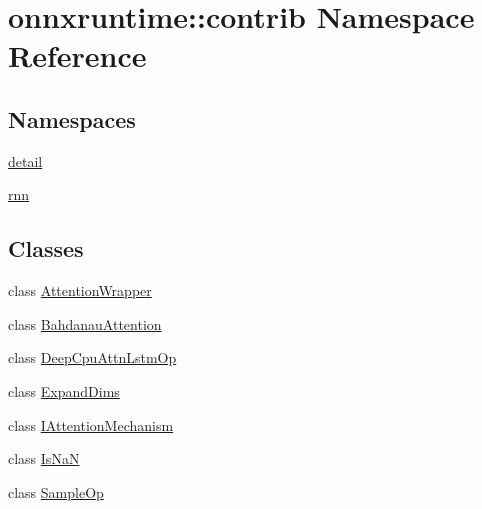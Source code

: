 \hypertarget{namespaceonnxruntime_1_1contrib}{}\section{onnxruntime\+:\+:contrib Namespace Reference}
\label{namespaceonnxruntime_1_1contrib}
\subsection*{Namespaces}
\begin{DoxyCompactItemize}
\item 
 \mbox{\hyperlink{namespaceonnxruntime_1_1contrib_1_1detail}{detail}}
\item 
 \mbox{\hyperlink{namespaceonnxruntime_1_1contrib_1_1rnn}{rnn}}
\end{DoxyCompactItemize}
\subsection*{Classes}
\begin{DoxyCompactItemize}
\item 
class \mbox{\hyperlink{classonnxruntime_1_1contrib_1_1AttentionWrapper}{Attention\+Wrapper}}
\item 
class \mbox{\hyperlink{classonnxruntime_1_1contrib_1_1BahdanauAttention}{Bahdanau\+Attention}}
\item 
class \mbox{\hyperlink{classonnxruntime_1_1contrib_1_1DeepCpuAttnLstmOp}{Deep\+Cpu\+Attn\+Lstm\+Op}}
\item 
class \mbox{\hyperlink{classonnxruntime_1_1contrib_1_1ExpandDims}{Expand\+Dims}}
\item 
class \mbox{\hyperlink{classonnxruntime_1_1contrib_1_1IAttentionMechanism}{I\+Attention\+Mechanism}}
\item 
class \mbox{\hyperlink{classonnxruntime_1_1contrib_1_1IsNaN}{Is\+NaN}}
\item 
class \mbox{\hyperlink{classonnxruntime_1_1contrib_1_1SampleOp}{Sample\+Op}}
\end{DoxyCompactItemize}
